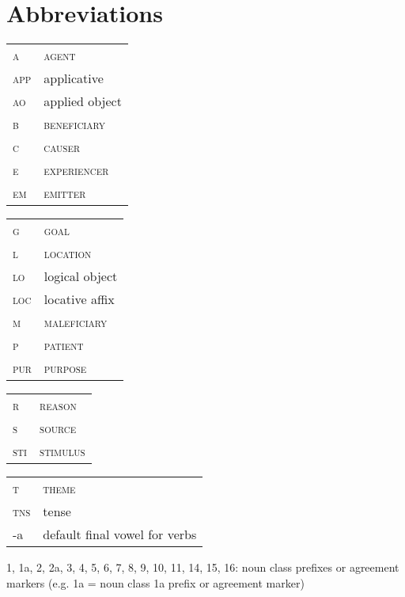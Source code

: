 \documentclass[output=paper]{langsci/langscibook}
\begin{document}
\section*{Abbreviations}

\begin{tabularx}{.45\textwidth}{lX}
\textsc{a} & \textsc{agent} \\
\textsc{app} & applicative \\
\textsc{ao} & applied object  \\
\textsc{b} & \textsc{beneficiary} \\
\textsc{c} & \textsc{causer} \\
\textsc{e} & \textsc{experiencer} \\
\textsc{em} & \textsc{emitter} \\
\end{tabularx}
\begin{tabularx}{.45\textwidth}{lX}
\textsc{g} & \textsc{goal} \\
\textsc{l} & \textsc{location} \\
\textsc{lo} & logical object  \\
\textsc{loc} & locative affix \\
\textsc{m} & \textsc{maleficiary} \\
\textsc{p} & \textsc{patient} \\
\textsc{pur} & \textsc{purpose}  \\
\end{tabularx}

\begin{tabularx}{.45\textwidth}{lX}
\textsc{r} & \textsc{reason} \\
\textsc{s} & \textsc{source} \\
\textsc{sti} & \textsc{stimulus} \\
\end{tabularx}
\begin{tabularx}{.45\textwidth}{lX}
\textsc{t} & \textsc{theme} \\
\textsc{tns} & tense  \\
-a & default final vowel for verbs \\
\end{tabularx}

1, 1a, 2, 2a, 3, 4, 5, 6, 7, 8, 9, 10, 11, 14, 15, 16: noun class prefixes or agreement markers (e.g. 1a = noun class 1a prefix or agreement marker)


\printbibliography[heading=subbibliography,notkeyword=this]
\end{document}
